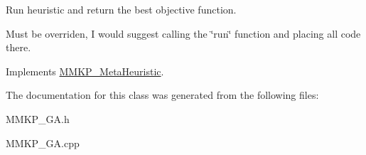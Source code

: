 Run heuristic and return the best objective function. 

Must be overriden, I would suggest calling the \char`\"{}run\char`\"{} function and placing all code there. 

Implements \hyperlink{class_m_m_k_p___meta_heuristic_acc3de42187c16d4a31776e18135035e5}{M\+M\+K\+P\+\_\+\+Meta\+Heuristic}.



The documentation for this class was generated from the following files\+:\begin{DoxyCompactItemize}
\item 
M\+M\+K\+P\+\_\+\+G\+A.\+h\item 
M\+M\+K\+P\+\_\+\+G\+A.\+cpp\end{DoxyCompactItemize}
